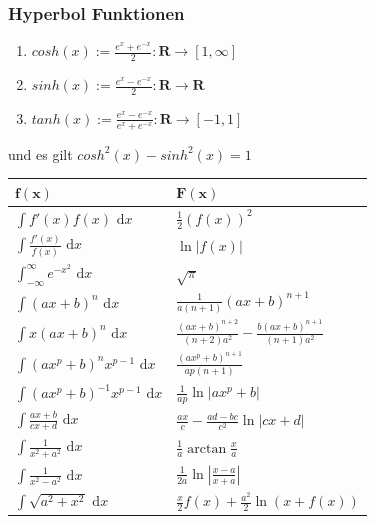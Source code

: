 \documentclass[8pt]{extarticle}
\def\dx{\text{ d}x}
\begin{document}
\begin{multicols*}{3}
    \subsubsection {Hyperbol Funktionen}
  
  \begin{enumerate}[label=(\arabic*)]
    \item $cosh(x) := \frac{e^x + e^{-x}}{2}: \mathbf{R} \rightarrow [1, \infty]$
    \item $sinh(x) := \frac{e^x - e^{-x}}{2}: \mathbf{R} \rightarrow \mathbf{R}$
    \item $tanh(x) := \frac{e^x - e^{-x}}{e^x + e^{-x}}: \mathbf{R} \rightarrow [-1, 1]$
  \end{enumerate}
  und es gilt $cosh^2(x) - sinh^2(x) = 1$

\begin{center}
 \begin{tabularx}{\linewidth}{>{\centering\arraybackslash}X>{\centering\arraybackslash}X}
  
  $\mathbf{f(x)}$ & $\mathbf{F(x)}$ \\
  \midrule
  $\int f'(x) f(x) \dx$ & $\frac{1}{2}(f(x))^2$ \\
  $\int \frac{f'(x)}{f(x)} \dx$ & $\ln|f(x)|$ \\
  $\int_{-\infty}^\infty e^{-x^2} \dx$ & $\sqrt{\pi}$ \\
  $\int (ax+b)^n \dx$ & $\frac{1}{a(n+1)}(ax+b)^{n+1}$ \\
  $\int x(ax+b)^n \dx$ & $\frac{(ax+b)^{n+2}}{(n+2)a^2} - \frac{b(ax+b)^{n+1}}{(n+1)a^2}$ \\
  $\int (ax^p+b)^n x^{p-1} \dx$ & $\frac{(ax^p+b)^{n+1}}{ap(n+1)}$ \\
  $\int (ax^p + b)^{-1} x^{p-1} \dx$ & $\frac{1}{ap} \ln |ax^p + b|$ \\
  $\int \frac{ax+b}{cx+d} \dx$ & $\frac{ax}{c} - \frac{ad-bc}{c^2} \ln |cx +d|$ \\
  $\int \frac{1}{x^2+a^2} \dx$ & $\frac{1}{a} \arctan \frac{x}{a}$ \\
  $\int \frac{1}{x^2 - a^2} \dx$ & $\frac{1}{2a} \ln\left| \frac{x-a}{x+a} \right|$ \\
  $\int \sqrt{a^2+x^2} \dx $ & $\frac{x}{2}f(x) + \frac{a^2}{2}\ln(x+f(x))$ \\
  \bottomrule
 \end{tabularx}
\end{center}


\end{multicols*}
\end{document}

